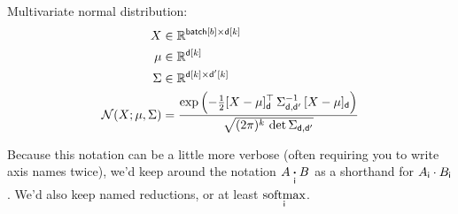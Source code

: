 Multivariate normal distribution:
\begin{align*} 
X &\in \mathbb{R}^{\nset{batch}{{b}} \times \nset{d}{{k}}}  \\
\mu &\in \mathbb{R}^{{\nset{d}{{k}}}}  \\
\Sigma & \in   \mathbb{R}^{{\nset{d}{k} \times \nset{d'}{k}}}  \\
{\cal N}(X; \mu, \Sigma) &= \frac{\displaystyle \exp\left(-\tfrac{1}{2} [X - \mu]_{\name{d}}^\top \, \Sigma_{\name{d},\name{d'}}^{-1} \, [X - \mu]_{\name{d}} \right)}{\sqrt{(2 \pi)^k \, \mathop{\text{det}} \Sigma_{\name{d},\name{d'}}}}
\end{align*}

Because this notation can be a little more verbose (often requiring you to write axis names twice), we'd keep around the notation $A \ndot{i} B$ as a shorthand for $A_{\name{i}} \cdot B_{\name{i}}$. We'd also keep named reductions, or at least $\nfun{i}{softmax}$.

